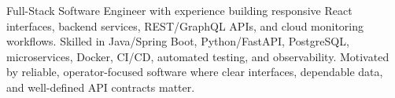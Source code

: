 \par{
Full-Stack Software Engineer with experience building responsive React interfaces, backend services, REST/GraphQL APIs, and cloud monitoring workflows. Skilled in Java/Spring Boot, Python/FastAPI, PostgreSQL, microservices, Docker, CI/CD, automated testing, and observability. Motivated by reliable, operator-focused software where clear interfaces, dependable data, and well-defined API contracts matter.
}
